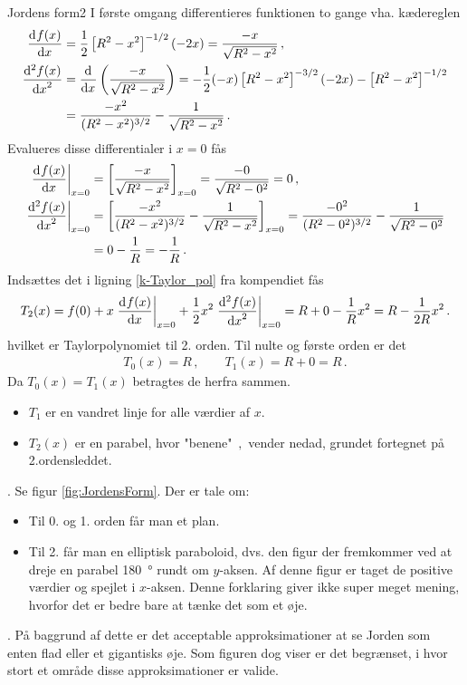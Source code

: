 \begin{opgave}{Jordens form}{2}
	I første omgang differentieres funktionen to gange vha. kædereglen
	\begin{align*}
	\dif{x}{f(x)} &= \frac{1}{2}\left[R^2 - x^2\right]^{-1/2}(-2x) = \frac{-x}{\sqrt{R^2 - x^2}} \, , \\
	\dif[2]{x}{f(x)} &= \dif{x}{}\left(\frac{-x}{\sqrt{R^2 - x^2}}\right) = -\frac{1}{2}(-x)\left[R^2 - x^2\right]^{-3/2}(-2x) - \left[R^2 - x^2\right]^{-1/2} \\
	&= \frac{-x^2}{(R^2 - x^2)^{3/2}} - \frac{1}{\sqrt{R^2 - x^2}} \, .
	\end{align*}
	Evalueres disse differentialer i $x = 0$ fås
	\begin{align*}
	\left.\dif{x}{f(x)}\right|_{x=0} &= \left[\frac{-x}{\sqrt{R^2 - x^2}}\right]_{x=0} = \frac{-0}{\sqrt{R^2 - 0^2}} = 0 \, , \\
	\left.\dif[2]{x}{f(x)}\right|_{x=0} &= \left[\frac{-x^2}{(R^2 - x^2)^{3/2}} - \frac{1}{\sqrt{R^2 - x^2}}\right]_{x=0} = \frac{-0^2}{(R^2 - 0^2)^{3/2}} - \frac{1}{\sqrt{R^2 - 0^2}} \\
	&= 0 - \frac{1}{R} = -\frac{1}{R} \, .
	\end{align*}
	\opg Indsættes det i ligning \eqref{k-Taylor_pol} fra kompendiet fås
	\begin{align*}
	T_2(x) = f(0) + x\left.\dif{x}{f(x)}\right|_{x=0} + \frac{1}{2}x^2\left.\dif[2]{x}{f(x)}\right|_{x=0} = R + 0 - \frac{1}{R}x^2 = R-\frac{1}{2R}x^2 \, .
	\end{align*}
	hvilket er Taylorpolynomiet til 2. orden. Til nulte og første orden er det
	\begin{align*}
	T_0(x) = R \, , \qquad T_1(x) = R + 0 = R \, .
	\end{align*}
	\opg Da $T_0(x) = T_1(x)$ betragtes de herfra sammen.
	\begin{itemize}
		\item $T_1$ er en vandret linje for alle værdier af $x$.
		\item $T_2(x)$ er en parabel, hvor "benene" $\, ,$ vender nedad, grundet fortegnet på 2.ordensleddet.
	\end{itemize}
	.
	\opg Se figur \ref{fig:JordensForm}.
	\opg Der er tale om:
	\begin{itemize}
		\item Til 0. og 1. orden får man et plan.
		\item 	Til 2. får man en elliptisk paraboloid, dvs. den figur der fremkommer ved at dreje en parabel \SI{180}{\degree} rundt om $y$-aksen. Af denne figur er taget de positive værdier og spejlet i $x$-aksen. Denne forklaring giver ikke super meget mening, hvorfor det er bedre bare at tænke det som et øje.
	\end{itemize}
	.
	\opg På baggrund af dette er det acceptable approksimationer at se Jorden som enten flad eller et gigantisks øje. Som figuren dog viser er det begrænset, i hvor stort et område disse approksimationer er valide.
\end{opgave}
